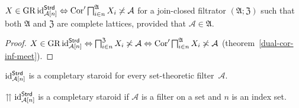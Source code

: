 \begin{lem}
$X\in\operatorname{GR}\operatorname{id}_{\mathcal{A}[n]}^{\mathsf{Strd}}\Leftrightarrow\operatorname{Cor}'\bigsqcap_{i\in n}^{\mathfrak{A}}X_{i}\not\asymp\mathcal{A}$
for a join-closed filtrator $(\mathfrak{A};\mathfrak{Z})$ such that
both $\mathfrak{A}$ and $\mathfrak{Z}$ are complete lattices, provided
that $\mathcal{A}\in\mathfrak{A}$.\end{lem}
\begin{proof}
$X\in\operatorname{GR}\operatorname{id}_{\mathcal{A}[n]}^{\mathsf{Strd}}\Leftrightarrow\bigsqcap_{i\in n}^{\mathfrak{Z}}X_{i}\not\asymp\mathcal{A}\Leftrightarrow\operatorname{Cor}'\bigsqcap_{i\in n}^{\mathfrak{A}}X_{i}\not\asymp\mathcal{A}$ (theorem~\ref{dual-cor-inf-meet}).\end{proof}
\begin{conjecture}
$\operatorname{id}_{\mathcal{A}[n]}^{\mathsf{Strd}}$ is a completary staroid for
every set-theoretic filter~$\mathcal{A}$.
\end{conjecture}
\begin{conjecture}
$\upuparrows\operatorname{id}_{\mathcal{A}[n]}^{\mathsf{Strd}}$ is a completary
staroid if $\mathcal{A}$ is a filter on a set and $n$ is an index
set.
\end{conjecture}

